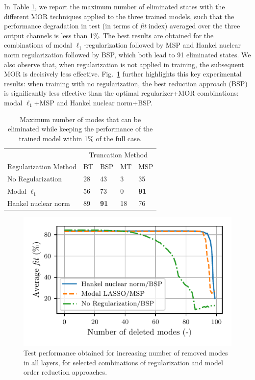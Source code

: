 \documentclass{article} %
\begin{document}
In Table \ref{tab:regularization}, we report the maximum number of eliminated states  with the different MOR techniques applied to the three  trained models, such that the performance degradation in test (in terms of \emph{fit} index) averaged over the three output channels is less than 1\%. The best results are obtained for the combinations of modal $\ell_1$-regularization followed by MSP and Hankel nuclear norm regularization followed by BSP, which both lead to 91 eliminated states. We also observe that, when regularization is not applied in training, the subsequent MOR is decisively less effective. Fig.~\ref{fig:fit_vs_removed} further highlights this key experimental results: when training with no regularization, the best reduction approach (BSP) is significantly less effective than the optimal regularizer+MOR combinations: modal $\ell_1$+MSP and Hankel nuclear norm+BSP.


\begin{table}%
    \centering
    \begin{tabular}{@{}lllll@{}}
    \toprule
    & \multicolumn{4}{c}{Truncation Method} \\ \cmidrule(lr){2-5}
    Regularization Method & BT & BSP & MT & MSP \\ \midrule
    No Regularization & 28 & 43 & 3 & 35 \\
    Modal $\ell_1$& 56 & 73 & 0 & \textbf{91} \\
    Hankel nuclear norm& 89 & \textbf{91} & 18 & 76 \\ \bottomrule
    \end{tabular}
    \caption{Maximum number of modes that can be eliminated while keeping the performance of the trained model within 1\% of the full case.}
    \label{tab:regularization}
\end{table}


\begin{figure}
\centering
\includegraphics[scale=.8]{figures/F16/MOR_regularization.pdf}
\caption{Test performance obtained for increasing number of removed modes in all layers, for selected combinations of regularization and model order reduction approaches.}
\label{fig:fit_vs_removed}
\end{figure}
\end{document}
